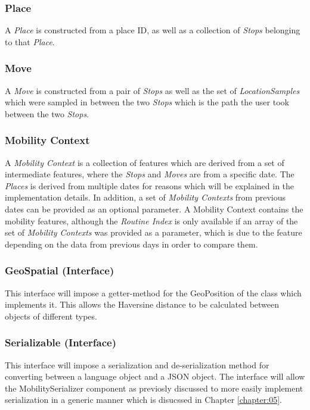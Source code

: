 \subsubsection*{Place}
A \textit{Place} is constructed from a place ID, as well as a collection of \textit{Stops} belonging to that \textit{Place}. 

\subsubsection*{Move}
A \textit{Move} is constructed from a pair of \textit{Stops} as well as the set of \textit{LocationSamples} which were sampled in between the two \textit{Stops} which is the path the user took between the two \textit{Stops}.

\subsubsection*{Mobility Context}
A \textit{Mobility Context} is a collection of features which are derived from a set of intermediate features, where the \textit{Stops} and \textit{Moves} are from a specific date. The \textit{Places} is derived from multiple dates for reasons which will be explained in the implementation details. In addition, a set of \textit{Mobility Contexts} from previous dates can be provided as an optional parameter. A Mobility Context contains the mobility features, although the \textit{Routine Index} is only available if an array of the set of \textit{Mobility Contexts} was provided as a parameter, which is due to the feature depending on the data from previous days in order to compare them.

\subsubsection*{GeoSpatial (Interface)}
This interface will impose a getter-method for the GeoPosition of the class which implements it. This allows the Haversine distance to be calculated between objects of different types.

\subsubsection*{Serializable (Interface)}
This interface will impose a serialization and de-serialization method for converting between a language object and a JSON object. The interface will allow the MobilitySerializer component as previosly discussed to more easily implement serialization in a generic manner which is disucssed in Chapter \ref{chapter:05}.

